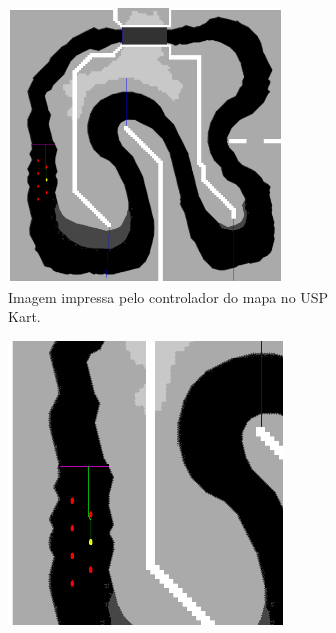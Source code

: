 \begin{figure}[H]
    \centering
    \begin{subfigure}[t]{0.45\textwidth}
        \centering
        \includegraphics[width=0.8\textwidth]{figuras/Mapa modelado.png}
        \caption{Imagem impressa pelo controlador do mapa no USP Kart.}
        \label{fig:mapa-modelado}
    \end{subfigure}
    \hfill
    \begin{subfigure}[t]{0.45\textwidth}
        \centering
        \includegraphics[width=0.8\textwidth]{figuras/Mapa modelado cortado.png}

\end{subfigure}
\end{figure}
